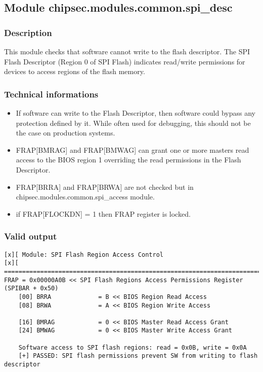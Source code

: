 \hypertarget{module-chipsec.modules.common.spi_desc}{%
\subsection{Module
chipsec.modules.common.spi\_desc}\label{module-chipsec.modules.common.spi_desc}}

\hypertarget{description-1}{%
\subsubsection{Description}\label{description-1}}

This module checks that software cannot write to the flash descriptor.
The SPI Flash Descriptor (Region 0 of SPI Flash) indicates read/write
permissions for devices to access regions of the flash memory.

\hypertarget{technical-informations-1}{%
\subsubsection{Technical informations}\label{technical-informations-1}}

\begin{itemize}
\tightlist
\item
  If software can write to the Flash Descriptor, then software could
  bypass any protection defined by it. While often used for debugging,
  this should not be the case on production systems.
\item
  FRAP{[}BMRAG{]} and FRAP{[}BMWAG{]} can grant one or more masters read
  access to the BIOS region 1 overriding the read permissions in the
  Flash Descriptor.
\item
  FRAP{[}BRRA{]} and FRAP{[}BRWA{]} are not checked but in
  chipsec.modules.common.spi\_access module.
\item
  if FRAP{[}FLOCKDN{]} = 1 then FRAP register is locked.
\end{itemize}

\hypertarget{valid-output-1}{%
\subsubsection{Valid output}\label{valid-output-1}}

\begin{verbatim}
[x][ Module: SPI Flash Region Access Control
[x][ =======================================================================
FRAP = 0x00000A0B << SPI Flash Regions Access Permissions Register (SPIBAR + 0x50)
    [00] BRRA             = B << BIOS Region Read Access 
    [08] BRWA             = A << BIOS Region Write Access 

    [16] BMRAG            = 0 << BIOS Master Read Access Grant 
    [24] BMWAG            = 0 << BIOS Master Write Access Grant
    
    Software access to SPI flash regions: read = 0x0B, write = 0x0A
    [+] PASSED: SPI flash permissions prevent SW from writing to flash descriptor
\end{verbatim}


